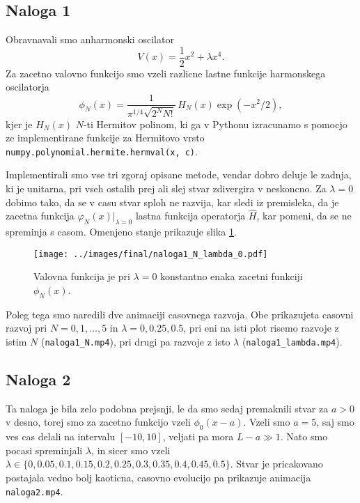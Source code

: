 \documentclass[11pt, a4paper]{article}
\begin{document}
    \subsection*{Naloga 1}
    Obravnavali smo anharmonski oscilator $$V(x) = \frac{1}{2} x^2 + \lambda x^4.$$
    Za zacetno valovno funkcijo smo vzeli razlicne lastne funkcije harmonskega oscilatorja
    $$\phi_N(x) = \frac{1}{\pi^{1/4} \sqrt{2^N N!}} \, H_N(x) \exp(-x^2/2),$$
    kjer je $H_N(x)$ $N$-ti Hermitov polinom, ki ga v Pythonu izracunamo s pomocjo ze implementirane funkcije
    za Hermitovo vrsto \texttt{numpy.polynomial.hermite.hermval(x, c)}.

    Implementirali smo vse tri zgoraj opisane metode, vendar dobro deluje le zadnja, ki je
    unitarna, pri vseh ostalih prej ali slej stvar zdivergira v neskoncno. Za $\lambda = 0$ dobimo
    tako, da se v casu stvar sploh ne razvija, kar sledi iz premisleka, da je zacetna funkcija $\varphi_N(x)|_{\lambda=0}$ lastna
    funkcija operatorja $\hat{H}$, kar pomeni, da se ne spreminja s casom. Omenjeno stanje prikazuje slika
    \ref{fig:naloga1_lambda0}.

    \begin{figure}
        \texttt{[image: ../images/final/naloga1\_N\_lambda\_0.pdf]} 
        \caption{Valovna funkcija je pri $\lambda = 0$ konstantno enaka zacetni funkciji
        $\phi_N(x)$.}
        \label{fig:naloga1_lambda0}
    \end{figure}

    Poleg tega smo naredili dve animaciji casovnega razvoja. Obe prikazujeta casovni razvoj pri $N = 0,1,\dotsc,5$ in
    $\lambda = 0, 0.25, 0.5$, pri eni na isti plot risemo razvoje z istim $N$ (\texttt{naloga1\_N.mp4}), pri drugi pa razvoje z isto $\lambda$
    (\texttt{naloga1\_lambda.mp4}).

    \subsection{Naloga 2}

    Ta naloga je bila zelo podobna prejsnji, le da smo sedaj premaknili stvar za $a > 0$ v desno, torej
    smo za zacetno funkcijo vzeli $\phi_0(x-a)$. Vzeli smo $a = 5$, saj smo ves cas delali na intervalu $[-10, 10]$,
    veljati pa mora $L - a \gg 1$. Nato smo pocasi spreminjali $\lambda$, in sicer smo vzeli $\lambda \in \{ 0, 0.05, 0.1, 0.15, 0.2, 0.25, 0.3, 0.35, 0.4, 0.45, 0.5\}$.
    Stvar je pricakovano postajala vedno bolj kaoticna, casovno evolucijo pa prikazuje animacija \texttt{naloga2.mp4}.
\end{document}
